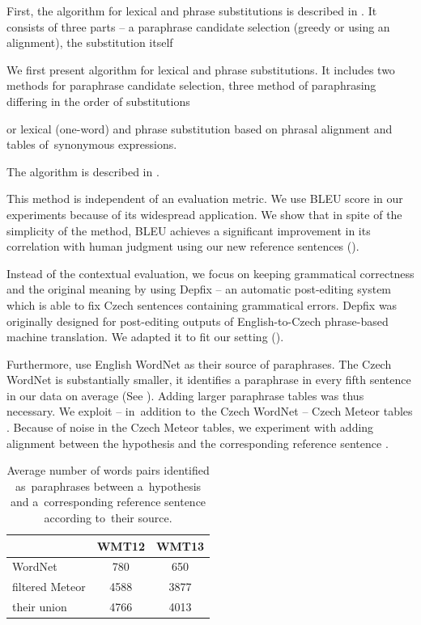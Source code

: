 First, the algorithm for lexical and phrase substitutions is described in .
It consists of three parts -- a paraphrase candidate selection (greedy or using an alignment),
the substitution itself



We first present algorithm for lexical and phrase substitutions. It includes two methods
for paraphrase candidate selection, three method of paraphrasing differing in the order
of substitutions


or lexical (one-word) and phrase 
substitution based on phrasal alignment and tables of~synonymous 
expressions. 

The algorithm is described in .

This method is independent of an evaluation metric. We use BLEU score in our 
experiments because of its widespread application.  We show that in spite of the 
simplicity of the method, BLEU achieves a significant improvement in its 
correlation with human judgment using our new reference sentences ().

Instead of the contextual evaluation, we focus on keeping grammatical 
correctness and the original meaning by using Depfix \citep{depfix} -- an 
automatic post-editing system which is able to fix Czech sentences containing 
grammatical errors. Depfix was originally designed for post-editing outputs of 
English-to-Czech phrase-based machine translation. We adapted it to fit our 
setting ().

Furthermore, \citet{kauchak} use English WordNet as their source of paraphrases.
The Czech WordNet \citep{czech-wordnet} is substantially smaller, it identifies a
paraphrase in every fifth sentence in our data on average (See 
). Adding larger paraphrase tables was thus necessary.
We exploit --  in~addition to~the Czech WordNet --  Czech Meteor tables 
\citep{meteor-tables}.  Because of noise in the Czech Meteor tables, we 
experiment with adding alignment between the hypothesis and the corresponding 
reference sentence .


\begin{table}[t]
\begin{center}
\begin{tabular}{l|cc}
& WMT12 & WMT13 \\
\hline
WordNet            &  780 & 650 \\
filtered Meteor    & 4588 & 3877 \\
their union        & 4766 & 4013 \\
\end{tabular}
\caption{Average number of words pairs identified as~paraphrases between 
a~hypothesis and a~corresponding reference sentence according to~their source.}
\label{number_of_substitutions}
\end{center}
\end{table}

